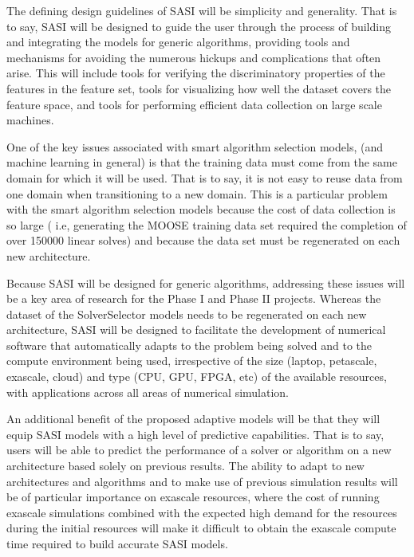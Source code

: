 The defining design guidelines of SASI will be simplicity and generality. That is to say, SASI will be designed to guide the user through the process of building and integrating the models for generic algorithms, providing tools and mechanisms for avoiding the numerous hickups and complications that often arise. This will include tools for verifying the discriminatory properties of the features in the feature set, tools for visualizing how well the dataset covers the feature space, and tools for performing efficient data collection on large scale machines. 

One of the key issues associated with smart algorithm selection models,  (and machine learning in general) is that the training data must come from the same domain for which it will be used. That is to say, it is not easy to reuse data from one domain when transitioning to a new domain. This is a particular problem with the smart algorithm selection models because the cost of data collection is so large ( i.e, generating the MOOSE training data set required the completion of over 150000 linear solves) and because the data set must be regenerated on each new architecture. 

Because SASI will be designed for generic algorithms, addressing these issues will be a key area of research for the Phase I and Phase II projects. Whereas the dataset of the SolverSelector models needs to be regenerated on each new architecture, SASI will be designed to facilitate the development of numerical software that automatically adapts to the problem being solved and to the compute environment being used, irrespective of the size (laptop, petascale, exascale, cloud) and type (CPU, GPU, FPGA, etc) of the available resources, with applications across all areas of numerical simulation. 

An additional benefit of the proposed adaptive models will be that they will equip SASI models with a high level of predictive capabilities. That is to say, users will be able to predict the performance of a solver or algorithm on a new architecture based solely on previous results. The ability to adapt to new architectures and algorithms and to make use of previous simulation results will be of particular importance on exascale resources, where the cost of running exascale simulations combined with the expected high demand for the resources during the initial resources will make it difficult to obtain the exascale compute time required to build accurate SASI models. 

